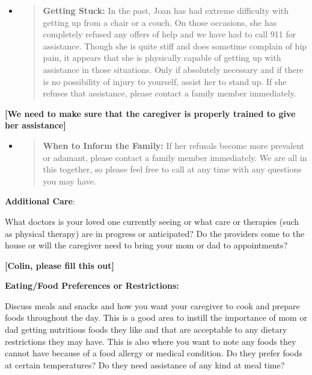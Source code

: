 \documentclass[]{article}
\begin{document}
\begin{itemize}
\item
  \begin{quote}
  \textbf{Getting Stuck:} In the past, Joan has had extreme difficulty
  with getting up from a chair or a couch. On those occasions, she has
  completely refused any offers of help and we have had to call 911 for
  assistance. Though she is quite stiff and does sometime complain of
  hip pain, it appears that she is physically capable of getting up with
  assistance in those situations. Only if absolutely necessary and if
  there is no possibility of injury to yourself, assist her to stand up.
  If she refuses that assistance, please contact a family member
  immediately.
  \end{quote}
\end{itemize}

\textbf{{[}We need to make sure that the caregiver is properly trained
to give her assistance{]}}

\begin{itemize}
\item
  \begin{quote}
  \textbf{When to Inform the Family:} If her refusals become more
  prevalent or adamant, please contact a family member immediately. We
  are all in this together, so please feel free to call at any time with
  any questions you may have.
  \end{quote}
\end{itemize}

\textbf{Additional Care}:

What doctors is your loved one currently seeing or what care or
therapies (such as physical therapy) are in progress or anticipated? Do
the providers come to the house or will the caregiver need to bring your
mom or dad to appointments?

\textbf{{[}Colin, please fill this out{]}}

\textbf{Eating/Food Preferences or Restrictions:}

Discuss meals and snacks and how you want your caregiver to cook and
prepare foods throughout the day. This is a good area to instill the
importance of mom or dad getting nutritious foods they like and that are
acceptable to any dietary restrictions they may have. This is also where
you want to note any foods they cannot have because of a food allergy or
medical condition. Do they prefer foods at certain temperatures? Do they
need assistance of any kind at meal time?
\end{document}
